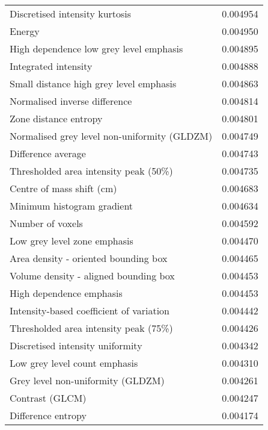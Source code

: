 \begin{longtable}{|lr|}
Discretised intensity kurtosis                     &        0.004954 \\
Energy                                             &        0.004950 \\
High dependence low grey level emphasis            &        0.004895 \\
Integrated intensity                               &        0.004888 \\
Small distance high grey level emphasis            &        0.004863 \\
Normalised inverse difference                      &        0.004814 \\
Zone distance entropy                              &        0.004801 \\
Normalised grey level non-uniformity (GLDZM)       &        0.004749 \\
Difference average                                 &        0.004743 \\
Thresholded area intensity peak (50\%)              &        0.004735 \\
Centre of mass shift (cm)                          &        0.004683 \\
Minimum histogram gradient                         &        0.004634 \\
Number of voxels                                   &        0.004592 \\
Low grey level zone emphasis                       &        0.004470 \\
Area density - oriented bounding box               &        0.004465 \\
Volume density - aligned bounding box              &        0.004453 \\
High dependence emphasis                           &        0.004453 \\
Intensity-based coefficient of variation           &        0.004442 \\
Thresholded area intensity peak (75\%)              &        0.004426 \\
Discretised intensity uniformity                   &        0.004342 \\
Low grey level count emphasis                      &        0.004310 \\
Grey level non-uniformity (GLDZM)                  &        0.004261 \\
Contrast (GLCM)                                    &        0.004247 \\
Difference entropy                                 &        0.004174 \\

\end{longtable}
